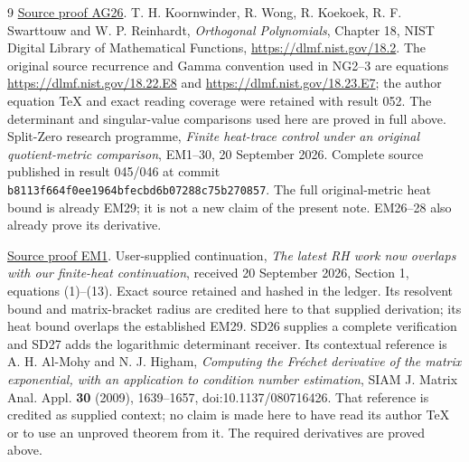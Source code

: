 \documentclass[11pt]{article}
\begin{document}
\begin{thebibliography}{9}
\href{https://github.com/KokunoYumeto/zeta-function-research-reader/blob/5992ad50c0f2a06921f1fcaded7b4e38097c0739/workbenches/splitzero-tandem/continuations/20260920-original-kernel-mixed-determinants/providers/ABSOLUTE_GAMMA_AND_ACTION.tex\#L358}{Source proof AG26}.
 T. H. Koornwinder, R. Wong, R. Koekoek,
R. F. Swarttouw and W. P. Reinhardt, \emph{Orthogonal Polynomials},
Chapter 18, NIST Digital Library of Mathematical Functions,
\url{https://dlmf.nist.gov/18.2}. The original source recurrence and
Gamma convention used in NG2--3 are equations
\url{https://dlmf.nist.gov/18.22.E8} and
\url{https://dlmf.nist.gov/18.23.E7}; the author equation TeX and exact
reading coverage were retained with result 052. The determinant and
singular-value comparisons used here are proved in full above.
 Split-Zero research programme, \emph{Finite heat-trace
control under an original quotient-metric comparison}, EM1--30,
20 September 2026. Complete source published in result 045/046 at
commit \nolinkurl{b8113f664f0ee1964bfecbd6b07288c75b270857}.
The full original-metric heat bound is already EM29; it is not a new
claim of the present note. EM26--28 also already prove its derivative.

\href{https://github.com/KokunoYumeto/zeta-function-research-reader/blob/5992ad50c0f2a06921f1fcaded7b4e38097c0739/workbenches/splitzero-tandem/continuations/20260920-original-kernel-mixed-determinants/providers/ENDPOINT_METRIC_HEAT.tex\#L38}{Source proof EM1}.
 User-supplied continuation, \emph{The latest RH
work now overlaps with our finite-heat continuation}, received
20 September 2026, Section 1, equations (1)--(13). Exact source retained
and hashed in the ledger. Its resolvent bound and matrix-bracket radius
are credited here to that supplied derivation; its heat bound overlaps
the established EM29. SD26 supplies a complete verification and SD27 adds the logarithmic
determinant receiver. Its contextual reference is A. H. Al-Mohy and
N. J. Higham, \emph{Computing the Fr\'echet derivative of the matrix
exponential, with an application to condition number estimation},
SIAM J. Matrix Anal. Appl. \textbf{30} (2009), 1639--1657,
doi:10.1137/080716426. That reference is credited as supplied context;
no claim is made here to have read its author TeX or to use an unproved
theorem from it. The required derivatives are proved above.
\end{thebibliography}
\end{document}
